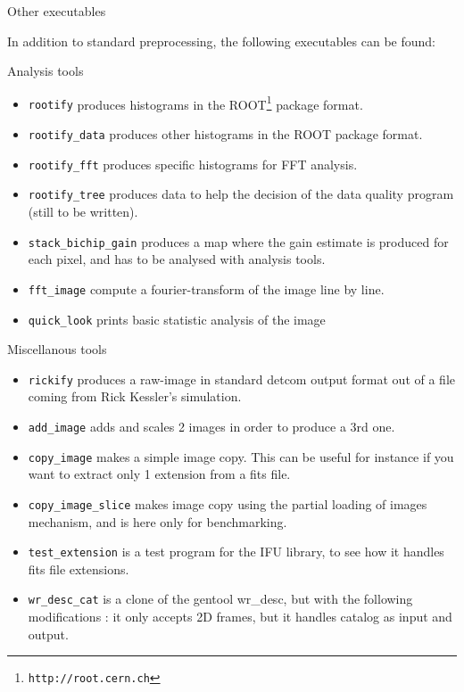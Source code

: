 \begin{subsection}{Other executables}

In addition to standard preprocessing, the following executables can
be found:

\begin{subsubsection}{Analysis tools}

\begin{itemize}
\item {\tt rootify} produces histograms in the ROOT\footnote{\tt http://root.cern.ch} package format.
\item {\tt rootify\_data} produces other histograms in the ROOT package
format.
\item {\tt rootify\_fft} produces specific histograms for FFT analysis.
\item {\tt rootify\_tree} produces data to help the decision of the
data quality program (still to be written).
\item {\tt stack\_bichip\_gain} produces a map where the gain estimate
is produced for each pixel, and has to be analysed with analysis tools.
\item {\tt fft\_image} compute a fourier-transform of the image line by
line.
\item {\tt quick\_look} prints basic statistic analysis of the image
\end{itemize}
\end{subsubsection}

\begin{subsubsection}{Miscellanous tools}

\begin{itemize}
\item {\tt rickify} produces a raw-image in standard detcom output
format out of a file coming from Rick Kessler's simulation.
\item {\tt add\_image} adds and scales 2 images in order to produce a
3rd one.
\item {\tt copy\_image} makes a simple image copy. This can be useful
for instance if you want to extract only 1 extension from a fits file.
\item {\tt copy\_image\_slice} makes image copy using the partial
loading of images mechanism, and is here only for benchmarking.
\item {\tt test\_extension} is a test program for the IFU library, to
see
how it handles fits file extensions.
\item {\tt wr\_desc\_cat} is a clone of the gentool wr\_desc, but with the
following modifications : it only accepts 2D frames, but it handles
catalog as input and output.
\end{itemize}


\end{subsubsection}
\end{subsection}
